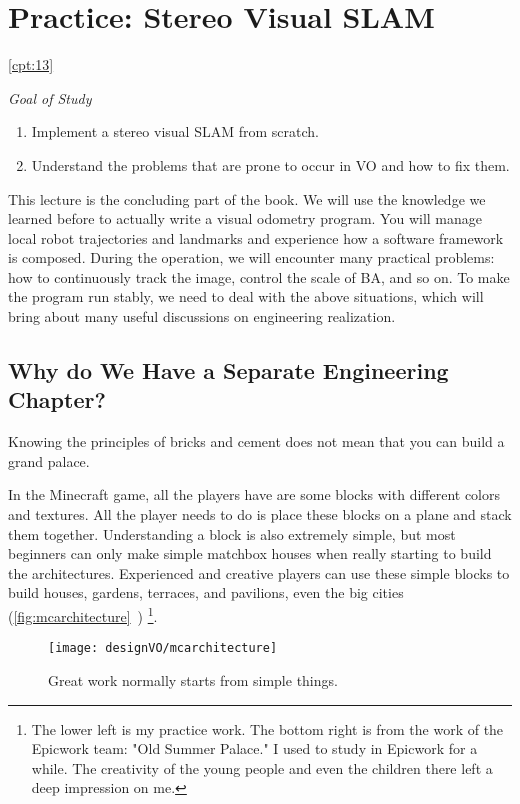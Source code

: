 \chapter{Practice: Stereo Visual SLAM}
\ref{cpt:13}
\begin{mdframed}  
	\textit{Goal of Study}
	\begin{enumerate}[labelindent=0em,leftmargin=1.5em]
	\item Implement a stereo visual SLAM from scratch.
	\item Understand the problems that are prone to occur in VO and how to fix them.
	\end{enumerate}
\end{mdframed}

This lecture is the concluding part of the book. We will use the knowledge we learned before to actually write a visual odometry program. You will manage local robot trajectories and landmarks and experience how a software framework is composed. During the operation, we will encounter many practical problems: how to continuously track the image, control the scale of BA, and so on. To make the program run stably, we need to deal with the above situations, which will bring about many useful discussions on engineering realization.

\newpage
\section{Why do We Have a Separate Engineering Chapter?}
Knowing the principles of bricks and cement does not mean that you can build a grand palace.

In the Minecraft game, all the players have are some blocks with different colors and textures. All the player needs to do is place these blocks on a plane and stack them together. Understanding a block is also extremely simple, but most beginners can only make simple matchbox houses when really starting to build the architectures. Experienced and creative players can use these simple blocks to build houses, gardens, terraces, and pavilions, even the big cities (\autoref{fig:mcarchitecture}~) \footnote{The lower left is my practice work. The bottom right is from the work of the Epicwork team: "Old Summer Palace." I used to study in Epicwork for a while. The creativity of the young people and even the children there left a deep impression on me. }.

\begin{figure}[!htp]
	\centering    
	\texttt{[image: designVO/mcarchitecture]}\\
	\caption{Great work normally starts from simple things.}
	\label{fig:mcarchitecture}
\end{figure}

